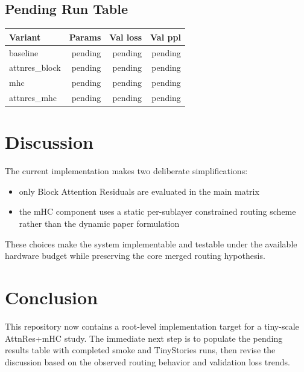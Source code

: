 \documentclass[11pt]{article}
\begin{document}
\subsection{Pending Run Table}
\begin{center}
\begin{tabular}{lrrr}
\toprule
Variant & Params & Val loss & Val ppl \\
\midrule
baseline & pending & pending & pending \\
attnres\_block & pending & pending & pending \\
mhc & pending & pending & pending \\
attnres\_mhc & pending & pending & pending \\
\bottomrule
\end{tabular}
\end{center}

\section{Discussion}
The current implementation makes two deliberate simplifications:
\begin{itemize}
\item only Block Attention Residuals are evaluated in the main matrix
\item the mHC component uses a static per-sublayer constrained routing scheme rather than the dynamic paper formulation
\end{itemize}
These choices make the system implementable and testable under the available hardware budget while preserving the core merged routing hypothesis.

\section{Conclusion}
This repository now contains a root-level implementation target for a tiny-scale AttnRes+mHC study. The immediate next step is to populate the pending results table with completed smoke and TinyStories runs, then revise the discussion based on the observed routing behavior and validation loss trends.
\end{document}
